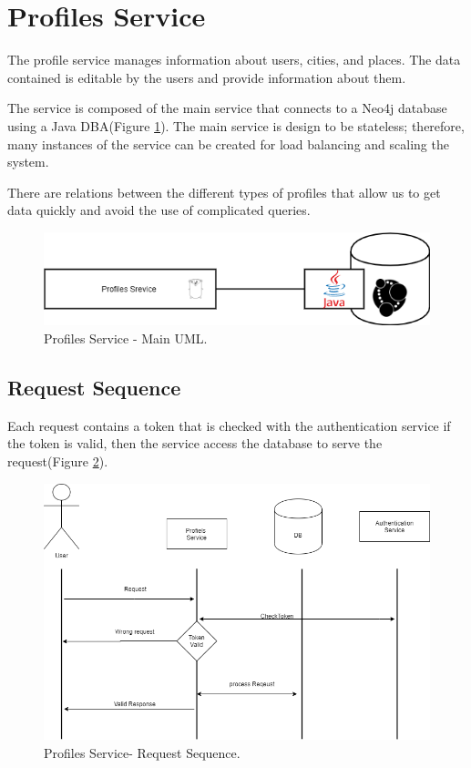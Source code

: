 \section{Profiles Service}

\indent
\indent
The profile service manages information about users, cities, and places. The data contained is editable by the users and provide information about them. 

The service is composed of the main service that connects to a Neo4j database using a Java DBA(Figure \ref{profiles:profilesmaindiagram}). The main service is design to be stateless; therefore, many instances of the service can be created for load balancing and scaling the system. 

There are relations between the different types of profiles that allow us to get data quickly and avoid the use of complicated queries.

\begin{figure}[H]
	\begin{center}
		\includegraphics[width=120mm,scale=1]{img/profiles/profile-main-diagram.png}
		\caption{Profiles Service - Main UML.}
		\label{profiles:profilesmaindiagram}
	\end{center}
	
\end{figure}

\subsection{Request Sequence}

Each request contains a token that is checked with the authentication service if the token is valid, then the service access the database to serve the request(Figure \ref{profiles:reqeustsequence}).

\begin{figure}
	\begin{center}
		\includegraphics[width=120mm,scale=1]{img/profiles/profile-request-sequence.png}
		\caption{Profiles Service- Request Sequence.}
		\label{profiles:reqeustsequence}
	\end{center}
\end{figure}


